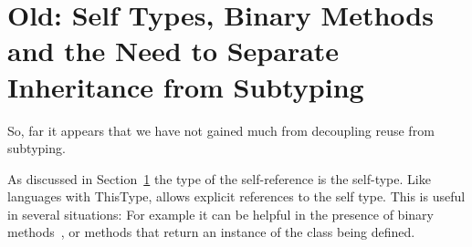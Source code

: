 \section{Old: Self Types, Binary Methods and the Need to Separate
  Inheritance from Subtyping}

So, far it appears that we have not gained much from decoupling
reuse from subtyping.

As discussed in Section~\ref{} the type of the self-reference is the
self-type. Like languages with ThisType, \name allows explicit
references to the self type. This is useful in several situations: 
For example it can be helpful in the presence of binary
methods~\cite{}, or methods that return an instance of the 
class being defined. 



